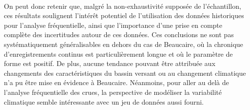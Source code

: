	\paragraph{} On peut donc retenir que, malgré la non-exhaustivité supposée de l'échantillon, ces résultats soulignent l'intérêt potentiel de l'utilisation des données historiques pour l'analyse fréquentielle, ainsi que l'importance d'une prise en compte complète des incertitudes autour de ces données. Ces conclusions ne sont pas systématiquement généralisables en dehors du cas de Beaucaire, où la chronique d'enregistrements continus est particulièrement longue et où le paramètre de forme est positif. De plus, aucune tendance pouvant être attribuée aux changements des caractéristiques du bassin versant ou au changement climatique n'a pu être mise en évidence à Beaucaire. Néanmoins, pour aller au delà de l'analyse fréquentielle des crues, la perspective de modéliser la variabilité climatique semble intéressante avec un jeu de données aussi fourni.

%
%
